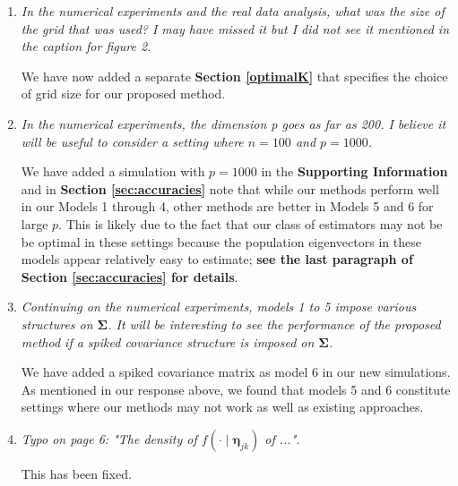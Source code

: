 \documentclass[12pt]{article}
\def\bs{\boldsymbol}
\begin{document}
\begin{enumerate}
\item \emph{In the numerical experiments and the real data analysis, what was the size of the grid that was used? I may have missed it but I did not see it mentioned in the caption for figure 2.}

  We have now added a separate \textbf{Section \ref{optimalK}} that specifies the choice of grid size for our proposed method.
  
\item \emph{In the numerical experiments, the dimension p goes as far as 200. I believe it will be useful to consider a setting where $n = 100$ and $p = 1000$.}

  We have added a simulation with $p = 1000$ in the \textbf{Supporting Information} and in \textbf{Section \ref{sec:accuracies}} note that while our methods perform well in our Models 1 through 4, other methods are better in Models 5 and 6 for large $p$. This is likely due to the fact that our class of estimators may not be be optimal in these settings because the population eigenvectors in these models appear relatively easy to estimate; \textbf{see the last paragraph of Section \ref{sec:accuracies} for details}.

  
\item \emph{Continuing on the numerical experiments, models 1 to 5 impose various structures on $\bs{\Sigma}$. It will be interesting to see the performance of the proposed method if a spiked covariance structure is imposed on $\bs{\Sigma}$.}

  We have added a spiked covariance matrix as model 6 in our new simulations. As mentioned in our response above, we found that models 5 and 6 constitute settings where our methods may not work as well as existing approaches.
  
\item \emph{Typo on page 6: "The density of $f(\cdot \mid \bs{\eta}_{jk})$ of ...".}

  This has been fixed.
\end{enumerate}
\end{document}
